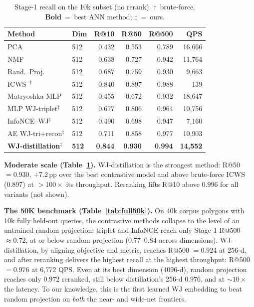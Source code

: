 \documentclass[sigconf]{acmart}
\begin{document}
\begin{table}[t]\centering
\caption{Stage-1 recall on the 10k subset (no rerank). $\dagger$~brute-force.
\textbf{Bold}~=~best ANN method; $\ddagger$~=~ours.}
\label{tab:results}\setlength{\tabcolsep}{4pt}\small
\begin{tabular}{@{}llrrrr@{}}
\toprule
Method & Dim & R@10 & R@50 & R@500 & QPS \\
\midrule
PCA~\cite{jolliffe02}                   & 512  & 0.432 & 0.553 & 0.789 & 16{,}666 \\
NMF~\cite{nmf99}                        & 512  & 0.638 & 0.727 & 0.942 & 11{,}764 \\
Rand.\ Proj.~\cite{achlioptas03}        & 512  & 0.687 & 0.759 & 0.930 &  9{,}663 \\
ICWS~\cite{ioffe10}$^\dagger$           & 512  & 0.840 & 0.897 & 0.988 &     139 \\
Matryoshka MLP~\cite{matryoshka22}      & 512  & 0.455 & 0.672 & 0.932 & 18{,}647 \\
\addlinespace[2pt]
MLP WJ-triplet$^\ddagger$               & 512  & 0.677 & 0.806 & 0.964 & 10{,}756 \\
InfoNCE--WJ$^\ddagger$                  & 512  & 0.490 & 0.698 & 0.947 &  7{,}160 \\
AE WJ-tri+recon$^\ddagger$              & 512  & 0.711 & 0.858 & 0.977 & 10{,}903 \\
\textbf{WJ-distillation}$^\ddagger$ & \textbf{512} & \textbf{0.844} & \textbf{0.930} & \textbf{0.994} & \textbf{14{,}552} \\
\bottomrule
\end{tabular}
\end{table}

\textbf{Moderate scale (Table~\ref{tab:results}).}
WJ-distillation is the strongest method: R@50 $=0.930$, $+7.2$\,pp over the best
contrastive model and above brute-force ICWS (0.897) at ${>}100\times$ its
throughput. Reranking lifts R@10 above $0.996$ for all variants (not shown).

\textbf{The 50K benchmark (Table~\ref{tab:full50k}).}
On 40k corpus polygons with 10k fully held-out queries, the contrastive methods
collapse to the level of an untrained random projection: triplet and InfoNCE reach
only Stage-1 R@500 $\approx 0.72$, at or below random projection ($0.77$--$0.84$
across dimensions). WJ-distillation, by aligning objective and metric, reaches
R@500 $=0.924$ at 256-d, and after reranking delivers the highest recall at the
highest throughput: R@500 $=0.976$ at 6{,}772 QPS. Even at its best dimension
(4096-d), random projection reaches only $0.972$ reranked, still below
distillation's 256-d $0.976$, and at ${\sim}10\times$ the latency. To our knowledge,
this is the first learned WJ embedding to beat random projection on \emph{both} the
near- and wide-net frontiers.
\end{document}
